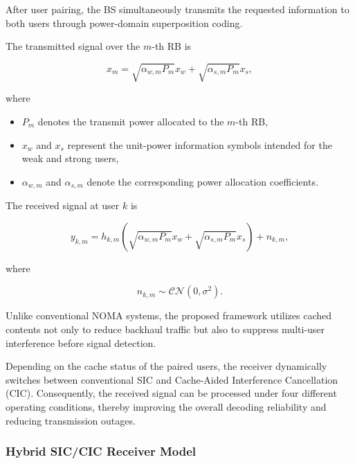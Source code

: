 \documentclass[12pt,a4paper]{article}
\begin{document}
After user pairing, the BS simultaneously transmits the requested information to both users through power-domain superposition coding.

The transmitted signal over the $m$-th RB is

\begin{equation}
x_m
=
\sqrt{\alpha_{w,m}P_m}x_w
+
\sqrt{\alpha_{s,m}P_m}x_s,
\label{eq:superposition}
\end{equation}

where

\begin{itemize}
\item $P_m$ denotes the transmit power allocated to the $m$-th RB,
\item $x_w$ and $x_s$ represent the unit-power information symbols intended for the weak and strong users,
\item $\alpha_{w,m}$ and $\alpha_{s,m}$ denote the corresponding power allocation coefficients.
\end{itemize}

The received signal at user $k$ is

\begin{equation}
y_{k,m}
=
h_{k,m}
\left(
\sqrt{\alpha_{w,m}P_m}x_w
+
\sqrt{\alpha_{s,m}P_m}x_s
\right)
+n_{k,m},
\end{equation}

where

\begin{equation}
n_{k,m}\sim\mathcal{CN}(0,\sigma^2).
\end{equation}

Unlike conventional NOMA systems, the proposed framework utilizes cached contents not only to reduce backhaul traffic but also to suppress multi-user interference before signal detection.

Depending on the cache status of the paired users, the receiver dynamically switches between conventional SIC and Cache-Aided Interference Cancellation (CIC). Consequently, the received signal can be processed under four different operating conditions, thereby improving the overall decoding reliability and reducing transmission outages.

\subsubsection{Hybrid SIC/CIC Receiver Model}
\end{document}
